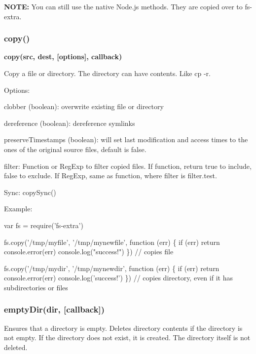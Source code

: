 {\bfseries N\+O\+TE\+:} You can still use the native Node.\+js methods. They are copied over to {\ttfamily fs-\/extra}.

\subsubsection*{copy()}

{\bfseries copy(src, dest, \mbox{[}options\mbox{]}, callback)}

Copy a file or directory. The directory can have contents. Like {\ttfamily cp -\/r}.

Options\+:
\begin{DoxyItemize}
\item clobber (boolean)\+: overwrite existing file or directory
\item dereference (boolean)\+: dereference symlinks
\item preserve\+Timestamps (boolean)\+: will set last modification and access times to the ones of the original source files, default is {\ttfamily false}.
\item filter\+: Function or Reg\+Exp to filter copied files. If function, return true to include, false to exclude. If Reg\+Exp, same as function, where {\ttfamily filter} is {\ttfamily filter.\+test}.
\end{DoxyItemize}

Sync\+: {\ttfamily copy\+Sync()}

Example\+:


\begin{DoxyCode}
var fs = require('fs-extra')

fs.copy('/tmp/myfile', '/tmp/mynewfile', function (err) \{
  if (err) return console.error(err)
  console.log("success!")
\}) // copies file

fs.copy('/tmp/mydir', '/tmp/mynewdir', function (err) \{
  if (err) return console.error(err)
  console.log('success!')
\}) // copies directory, even if it has subdirectories or files
\end{DoxyCode}


\subsubsection*{empty\+Dir(dir, \mbox{[}callback\mbox{]})}

Ensures that a directory is empty. Deletes directory contents if the directory is not empty. If the directory does not exist, it is created. The directory itself is not deleted.

